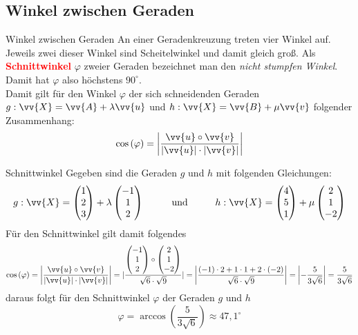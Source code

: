 \subsection{Winkel zwischen Geraden}
\begin{merke}{Winkel zwischen Geraden}{} 
    An einer Geradenkreuzung treten vier Winkel auf. Jeweils zwei dieser Winkel sind Scheitelwinkel und damit gleich groß. Als \textcolor{red}{\textbf{Schnittwinkel}} \(\varphi\) zweier Geraden bezeichnet man den \textit{nicht stumpfen Winkel}. Damit hat \(\varphi\) also höchstens \(90^{\circ}\). \\
    Damit gilt für den Winkel \(\varphi\) der sich schneidenden  Geraden \(g:\vv{X} = \vv{A} + \lambda \vv{u}\) und \(h: \vv{X} =\vv{B} + \mu \vv{v} \) folgender Zusammenhang:\[\cos{(\varphi)} = \left| \dfrac{\vv{u}\circ \vv{v}}{|\vv{u}| \cdot |\vv{v}|}\right|\]
\end{merke}
\begin{bsp}{Schnittwinkel}{}
 Gegeben sind die Geraden \(g\) und \(h\) mit folgenden Gleichungen:\[g: \vv{X}= \begin{pmatrix}
          1\\2\\3
      \end{pmatrix} + \lambda \begin{pmatrix}
          -1\\1\\2
      \end{pmatrix} \hspace{1cm} \text{und}\hspace{1cm}
      h:\vv{X} = \begin{pmatrix}
          4\\5\\1
      \end{pmatrix} + \mu \begin{pmatrix}
          2\\1\\-2
      \end{pmatrix}\]  
      Für den Schnittwinkel gilt damit folgendes 
      \begin{equation*}
              \cos{(\varphi)} = \left| \dfrac{\vv{u}\circ \vv{v}}{|\vv{u}|\cdot |\vv{v}|}\right| = |\dfrac{\begin{pmatrix}
          -1\\1\\2
      \end{pmatrix} \circ \begin{pmatrix}
          2\\1\\-2\end{pmatrix}}{\sqrt{6} \cdot \sqrt{9}} | = \left|\dfrac{(-1)\cdot 2 +1\cdot 1 +2\cdot (-2)}{\sqrt{6}\cdot \sqrt{9}}\right| = \left|-\dfrac{5}{3\sqrt{6}}\right|= \dfrac{5}{3\sqrt{6}}
      \end{equation*} 
      daraus folgt für den Schnittwinkel \(\varphi\) der Geraden \(g\) und \(h\)
      \begin{equation*}
           \varphi = \arccos{(\dfrac{5}{3\sqrt{6}})} \approx 47,1^{\circ}
      \end{equation*}
\end{bsp}

